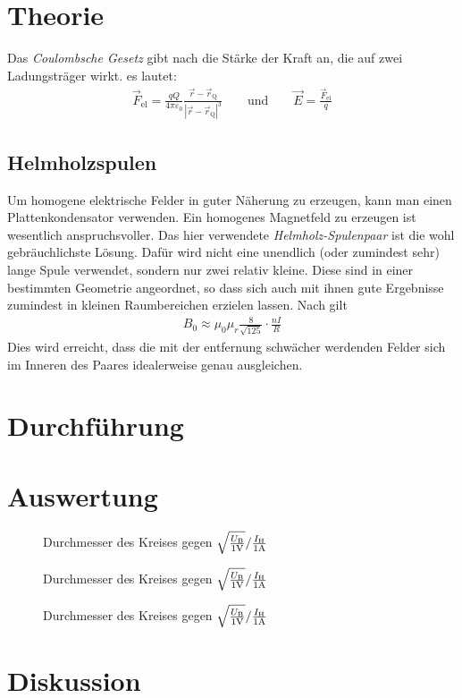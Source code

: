 \documentclass[12pt,a4paper,titlepage,headinclude,bibtotoc]{scrartcl}
\begin{document}
\section{Theorie}
\label{sec:theorie}
Das \emph{Coulombsche Gesetz} gibt nach \cite[S. 2]{demtroeder2} die Stärke der Kraft an, die auf zwei Ladungsträger wirkt.
es lautet:
\begin{align*}
	\vec F_\text{el}=\frac{qQ}{4\pi\varepsilon_0}\frac{\vec r-\vec r_\text{Q}}{|\vec r-\vec r_\text{Q}|^3}\qquad\text{und}\qquad\vec E =\frac{\vec F_\text{el}}{q}
\end{align*}
\subsection{Helmholzspulen}
Um homogene elektrische Felder in guter Näherung zu erzeugen, kann man einen Plattenkondensator verwenden.
Ein homogenes Magnetfeld zu erzeugen ist wesentlich anspruchsvoller. 
Das hier verwendete \emph{Helmholz-Spulenpaar} ist die wohl gebräuchlichste Lösung.
Dafür wird nicht eine unendlich (oder zumindest sehr) lange Spule verwendet, sondern nur zwei relativ kleine.
Diese sind in einer bestimmten Geometrie angeordnet, so dass sich auch mit ihnen gute Ergebnisse zumindest in kleinen Raumbereichen erzielen lassen.
Nach \cite[S. 94]{demtroeder2} gilt
\begin{align*}
	B_0\approx\mu_0\mu_r\frac{8}{\sqrt {125}}\cdot\frac{nI}{R}
\end{align*}
Dies wird erreicht, dass die mit der entfernung schwächer werdenden Felder sich im Inneren des Paares idealerweise genau ausgleichen.

\section{Durchführung}
\label{sec:durchfuehrung}

\section{Auswertung}
\label{sec:auswertung}
\begin{figure}[!h]
	\centering
	
	\caption{Durchmesser des Kreises gegen $\sqrt{\frac{U_\text{B}}{1\text V}}/\frac{I_\text{H}}{1\text A}$}
	\label{fig:UConst}
\end{figure}

\begin{figure}[!h]
	\centering
	
	\caption{Durchmesser des Kreises gegen $\sqrt{\frac{U_\text{B}}{1\text V}}/\frac{I_\text{H}}{1\text A}$}
	\label{fig:IConst}
\end{figure}
\begin{figure}[!h]
	\centering
	
	\caption{Durchmesser des Kreises gegen $\sqrt{\frac{U_\text{B}}{1\text V}}/\frac{I_\text{H}}{1\text A}$}
	\label{fig:UConst}
\end{figure}

\section{Diskussion}
\label{sec:diskussion}


\end{document}
